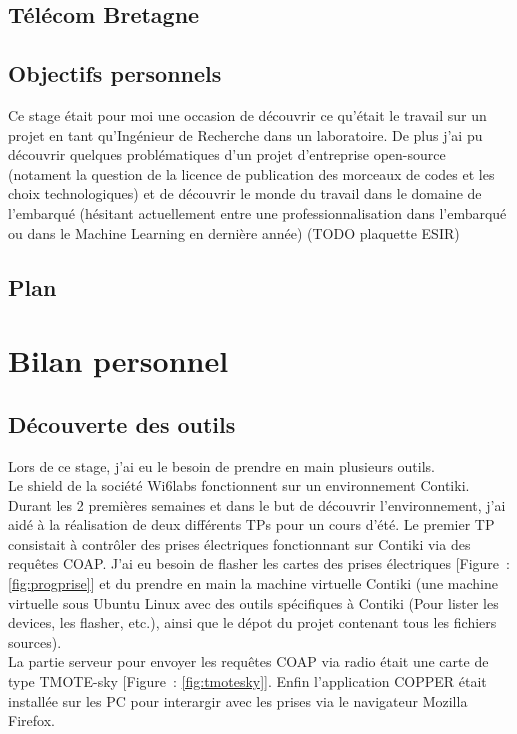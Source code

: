 \documentclass{article}
\begin{document}
\subsection{Télécom Bretagne}
\subsection{Objectifs personnels}
Ce stage était pour moi une occasion de découvrir ce qu'était le travail sur un projet en tant qu'Ingénieur de Recherche dans un laboratoire. De plus j'ai pu découvrir quelques problématiques d'un projet d'entreprise open-source (notament la question de la licence de publication des morceaux de codes et les choix technologiques) et de découvrir le monde du travail dans le domaine de l'embarqué (hésitant actuellement entre une professionnalisation dans l'embarqué ou dans le Machine Learning en dernière année) (TODO plaquette ESIR)
\subsection{Plan}

\section{Bilan personnel}
\subsection{Découverte des outils}
Lors de ce stage, j'ai eu le besoin de prendre en main plusieurs outils.\\
Le shield de la société Wi6labs fonctionnent sur un environnement Contiki. Durant les 2 premières semaines et dans le but de découvrir l'environnement, j'ai aidé à la réalisation de deux différents TPs pour un cours d'été. Le premier TP consistait à contrôler des prises électriques fonctionnant sur Contiki via des requêtes COAP. J'ai eu besoin de flasher les cartes des prises électriques [Figure~: \ref{fig:progprise}] et du prendre en main la machine virtuelle Contiki (une machine virtuelle sous Ubuntu Linux avec des outils spécifiques à Contiki (Pour lister les devices, les flasher, etc.), ainsi que le dépot du projet contenant tous les fichiers sources).\\
La partie serveur pour envoyer les requêtes COAP via radio était une carte de type TMOTE-sky [Figure~: \ref{fig:tmotesky}]. Enfin l'application COPPER était installée sur les PC pour interargir avec les prises via le navigateur Mozilla Firefox.\\
\end{document}
